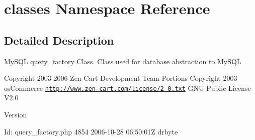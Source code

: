 \hypertarget{namespaceclasses}{
\section{classes Namespace Reference}
\label{namespaceclasses}
}


\subsection{Detailed Description}
MySQL query\_\-factory Class. Class used for database abstraction to MySQL

Copyright 2003-\/2006 Zen Cart Development Team  Portions Copyright 2003 osCommerce  \href{http://www.zen-cart.com/license/2_0.txt}{\tt http://www.zen-\/cart.com/license/2\_\-0.txt} GNU Public License V2.0 \begin{DoxyVersion}{Version}

\end{DoxyVersion}
\begin{DoxyParagraph}{Id:}
query\_\-factory.php 4854 2006-\/10-\/28 06:50:01Z drbyte 
\end{DoxyParagraph}
